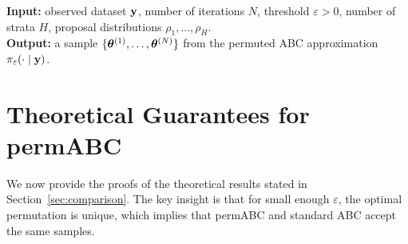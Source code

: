 

\begin{algorithm}
\caption{Stratified permABC Vanilla}
\textbf{Input: } observed dataset $\mathbf{y}$, number of iterations $N$, threshold $\varepsilon > 0$, number of strata $H$, proposal distributions $\rho_1, \dots, \rho_H$. \\
\textbf{Output: } a sample $\{\boldsymbol{\theta}^{(1)}, \dots, \boldsymbol{\theta}^{(N)}\}$ from the permuted ABC approximation $\pi_\varepsilon(\cdot \mid \mathbf{y})$.\\

\BlankLine

\end{algorithm}


\section{Theoretical Guarantees for permABC}
\label{appendix_proofs}

We now provide the proofs of the theoretical results stated in Section~\ref{sec:comparison}. The key insight is that for small enough $\varepsilon$, the optimal permutation is unique, which implies that permABC and standard ABC accept the same samples.

